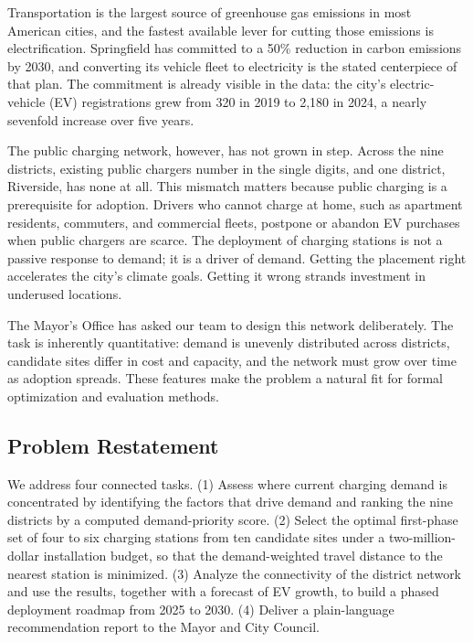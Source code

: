 \documentclass[12pt]{article}
\begin{document}
Transportation is the largest source of greenhouse gas emissions in most American cities,
and the fastest available lever for cutting those emissions is electrification. Springfield
has committed to a 50\% reduction in carbon emissions by 2030, and converting its
vehicle fleet to electricity is the stated centerpiece of that plan. The commitment is
already visible in the data: the city's electric-vehicle (EV) registrations grew from 320
in 2019 to 2,180 in 2024, a nearly sevenfold increase over five years.

The public charging network, however, has not grown in step. Across the nine districts,
existing public chargers number in the single digits, and one district, Riverside, has
none at all. This mismatch matters because public charging is a prerequisite for adoption.
Drivers who cannot charge at home, such as apartment residents, commuters, and commercial
fleets, postpone or abandon EV purchases when public chargers are scarce. The deployment of
charging stations is not a passive response to demand; it is a driver of demand.
Getting the placement right accelerates the city's climate goals. Getting it wrong strands
investment in underused locations.

The Mayor's Office has asked our team to design this network deliberately. The task is
inherently quantitative: demand is unevenly distributed across districts, candidate sites
differ in cost and capacity, and the network must grow over time as adoption spreads.
These features make the problem a natural fit for formal optimization and evaluation
methods.

\subsection{Problem Restatement}

We address four connected tasks. (1) Assess where current charging demand is concentrated
by identifying the factors that drive demand and ranking the nine districts by a computed
demand-priority score. (2) Select the optimal first-phase set of four to six charging
stations from ten candidate sites under a two-million-dollar installation budget, so that
the demand-weighted travel distance to the nearest station is minimized.
(3) Analyze the connectivity of the district
network and use the results, together with a forecast of EV growth, to build a phased
deployment roadmap from 2025 to 2030. (4) Deliver a plain-language recommendation report
to the Mayor and City Council.
\end{document}
